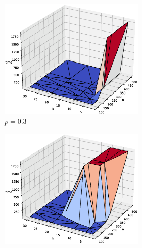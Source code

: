\begin{figure}[h!]
\begin{subfigure}[b]{\textwidth}
\begin{subfigure}[b]{0.32\textwidth}
	     \end{subfigure}
	  \end{subfigure}
	  \begin{subfigure}[b]{\textwidth}
	  	\centering
	      \begin{subfigure}[b]{0.32\textwidth}
	         \includegraphics[width=\columnwidth]{images/wsg3d4.eps}
	         \caption{$p=0.3$}
	     \end{subfigure}
	     \hspace{0em}
	      \begin{subfigure}[b]{0.32\textwidth}
	         \includegraphics[width=\columnwidth]{images/wsg3d5.eps}

\end{subfigure}
\end{subfigure}
\end{figure}
